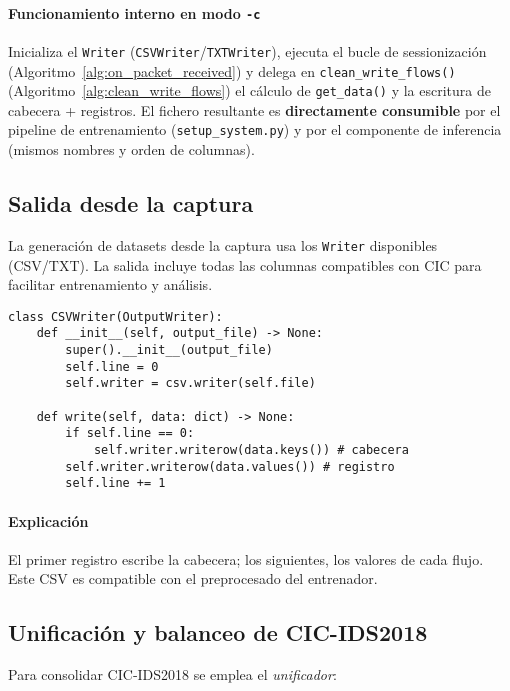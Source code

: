 \paragraph{Funcionamiento interno en modo \texttt{-c}}
Inicializa el \texttt{Writer} (\texttt{CSVWriter}/\texttt{TXTWriter}), ejecuta el bucle de sessionización (Algoritmo~\ref{alg:on_packet_received}) y delega en \texttt{clean\_write\_flows()} (Algoritmo~\ref{alg:clean_write_flows}) el cálculo de \texttt{get\_data()} y la escritura de cabecera + registros. El fichero resultante es \textbf{directamente consumible} por el pipeline de entrenamiento (\texttt{setup\_system.py}) y por el componente de inferencia (mismos nombres y orden de columnas).

\subsection*{Salida desde la captura}
La generación de datasets desde la captura usa los \texttt{Writer} disponibles (CSV/TXT). La salida incluye todas las columnas compatibles con CIC para facilitar entrenamiento y análisis.

\begin{lstlisting}[style=tfgpython,caption={Fábrica de escritores y salida en CSV (extracto)},label=List.WriterFactory]
class CSVWriter(OutputWriter):
    def __init__(self, output_file) -> None:
        super().__init__(output_file)
        self.line = 0
        self.writer = csv.writer(self.file)

    def write(self, data: dict) -> None:
        if self.line == 0:
            self.writer.writerow(data.keys()) # cabecera
        self.writer.writerow(data.values()) # registro
        self.line += 1
\end{lstlisting}

\paragraph{Explicación}
El primer registro escribe la cabecera; los siguientes, los valores de cada flujo. Este CSV es compatible con el preprocesado del entrenador.

\subsection*{Unificación y balanceo de CIC-IDS2018}
Para consolidar CIC‑IDS2018 se emplea el \textit{unificador}:

